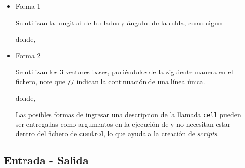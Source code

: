 \begin{itemize} 
\item{Forma 1}

Se utilizan la longitud de los lados y \'angulos de la celda, como sigue:


donde,


\item{Forma 2}

Se utilizan los 3 vectores bases, poni\'endolos de la siguiente manera en el fichero, note que \verb|//| indican la continuaci\'on de una l\'inea \'unica.

donde,

Las posibles formas de ingresar una descripcion de la llamada \verb|cell| pueden ser entregadas como argumentos en la ejecuci\'on de \lpmd y no necesitan estar dentro del fichero de \textbf{control}, lo que ayuda a la creaci\'on de \textit{scripts}.


\end{itemize}

\subsection{Entrada - Salida}

